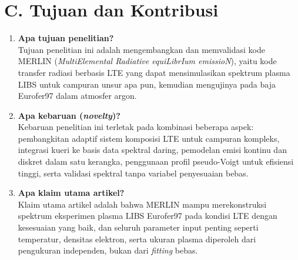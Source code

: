 \documentclass[12pt,a4paper]{article}
\begin{document}
\section*{C. Tujuan dan Kontribusi}
\begin{enumerate}
  \item \textbf{Apa tujuan penelitian?}\\
  Tujuan penelitian ini adalah mengembangkan dan memvalidasi kode MERLIN (\textit{MultiElemental Radiative equiLibrIum emissioN}), yaitu kode transfer radiasi berbasis LTE yang dapat mensimulasikan spektrum plasma LIBS untuk campuran unsur apa pun, kemudian mengujinya pada baja Eurofer97 dalam atmosfer argon.

  \item \textbf{Apa kebaruan (\textit{novelty})?}\\
  Kebaruan penelitian ini terletak pada kombinasi beberapa aspek: pembangkitan adaptif sistem komposisi LTE untuk campuran kompleks, integrasi kueri ke basis data spektral daring, pemodelan emisi kontinu dan diskret dalam satu kerangka, penggunaan profil pseudo-Voigt untuk efisiensi tinggi, serta validasi spektral tanpa variabel penyesuaian bebas.

  \item \textbf{Apa klaim utama artikel?}\\
  Klaim utama artikel adalah bahwa MERLIN mampu merekonstruksi spektrum eksperimen plasma LIBS Eurofer97 pada kondisi LTE dengan kesesuaian yang baik, dan seluruh parameter input penting seperti temperatur, densitas elektron, serta ukuran plasma diperoleh dari pengukuran independen, bukan dari \textit{fitting} bebas.
\end{enumerate}
\end{document}
